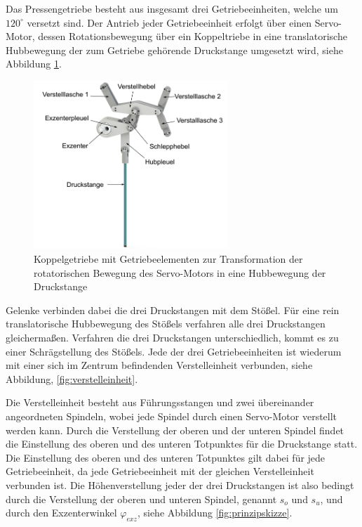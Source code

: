 Das Pressengetriebe besteht aus insgesamt drei Getriebeeinheiten, welche um $120^\circ$ versetzt sind. Der Antrieb jeder Getriebeeinheit erfolgt über einen Servo-Motor, dessen Rotationsbewegung über ein Koppeltriebe in eine translatorische Hubbewegung der zum Getriebe gehörende Druckstange umgesetzt wird, siehe Abbildung \ref{fig:koppel}.

\begin{figure} [h]
	\centering
	\includegraphics[width=0.65\textwidth]{images/exzenter}
	\caption{Koppelgetriebe mit Getriebeelementen zur Transformation der rotatorischen Bewegung des Servo-Motors in eine Hubbewegung der Druckstange \cite{Rakowitsch.2018}}
	\label{fig:koppel}
\end{figure}


Gelenke verbinden dabei die drei Druckstangen mit dem Stößel. Für eine rein translatorische Hubbewegung des Stößels verfahren alle drei Druckstangen gleichermaßen. Verfahren die drei Druckstangen unterschiedlich, kommt es zu einer Schrägstellung des Stößels. Jede der drei Getriebeeinheiten ist wiederum mit einer sich im Zentrum befindenden Verstelleinheit verbunden, siehe Abbildung, \ref{fig:verstelleinheit}.

Die Verstelleinheit besteht aus Führungsstangen und zwei übereinander angeordneten Spindeln, wobei jede Spindel durch einen Servo-Motor verstellt werden kann. Durch die Verstellung der oberen und der unteren Spindel findet die Einstellung des oberen und des unteren Totpunktes für die Druckstange statt. Die Einstellung des oberen und des unteren Totpunktes gilt dabei für jede Getriebeeinheit, da jede Getriebeeinheit mit der gleichen Verstelleinheit verbunden ist. Die Höhenverstellung jeder der drei Druckstangen ist also bedingt durch die Verstellung der oberen und unteren Spindel, genannt $s_o$ und $s_u$, und durch den Exzenterwinkel $\varphi_{exz}$, siehe Abbildung \ref{fig:prinzipskizze}.




